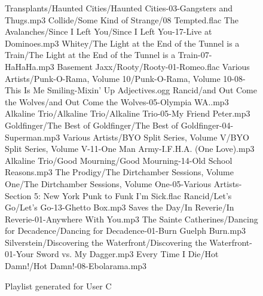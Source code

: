 \begin{figure}[p]
	\caption{Playlist generated for User C}
	\label{fig:testing:user:playlist:c}
	\begin{listing}{1}
Transplants/Haunted Cities/Haunted Cities-03-Gangsters and Thugs.mp3
Collide/Some Kind of Strange/08 Tempted.flac
The Avalanches/Since I Left You/Since I Left You-17-Live at Dominoes.mp3
Whitey/The Light at the End of the Tunnel is a Train/The Light at the End of the Tunnel is a Train-07-HaHaHa.mp3
Basement Jaxx/Rooty/Rooty-01-Romeo.flac
Various Artists/Punk-O-Rama, Volume 10/Punk-O-Rama, Volume 10-08-This Is Me Smiling-Mixin' Up Adjectives.ogg
Rancid/and Out Come the Wolves/and Out Come the Wolves-05-Olympia WA..mp3
Alkaline Trio/Alkaline Trio/Alkaline Trio-05-My Friend Peter.mp3
Goldfinger/The Best of Goldfinger/The Best of Goldfinger-04-Superman.mp3
Various Artists/BYO Split Series, Volume V/BYO Split Series, Volume V-11-One Man Army-I.F.H.A. (One Love).mp3
Alkaline Trio/Good Mourning/Good Mourning-14-Old School Reasons.mp3
The Prodigy/The Dirtchamber Sessions, Volume One/The Dirtchamber Sessions, Volume One-05-Various Artists-Section 5: New York Punk to Funk I'm Sick.flac
Rancid/Let's Go/Let's Go-13-Ghetto Box.mp3
Saves the Day/In Reverie/In Reverie-01-Anywhere With You.mp3
The Sainte Catherines/Dancing for Decadence/Dancing for Decadence-01-Burn Guelph Burn.mp3
Silverstein/Discovering the Waterfront/Discovering the Waterfront-01-Your Sword vs. My Dagger.mp3
Every Time I Die/Hot Damn!/Hot Damn!-08-Ebolarama.mp3
\end{listing}
\end{figure}
